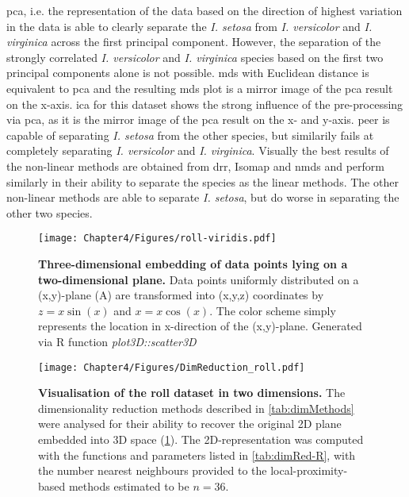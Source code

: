 \gls{pca}, i.e. the representation of the data based on the direction of highest variation in the data is able to clearly separate the \textit{I. setosa} from \textit{I. versicolor} and \textit{I. virginica} across the first principal component. However, the separation of the strongly correlated \textit{I. versicolor} and \textit{I. virginica} species based on the first two principal components alone is not possible. \gls{mds} with Euclidean distance is equivalent to \gls{pca} and the resulting \gls{mds} plot is a mirror image of the \gls{pca} result on the x-axis. \gls{ica} for this dataset shows the strong influence of the pre-processing via \gls{pca}, as it is the mirror image of the \gls{pca} result on the x- and y-axis. \gls{peer} is capable of separating \textit{I. setosa} from the other species, but similarily fails at completely separating \textit{I. versicolor} and \textit{I. virginica}. 
Visually the best results of the non-linear methods are obtained from \gls{drr}, Isomap and \gls{nmds} and perform similarly in their ability to separate the species as the linear methods. The other non-linear methods are able to separate \textit{I. setosa}, but do worse in separating the other two species.

\begin{figure}[p]
	\centering
	\texttt{[image: Chapter4/Figures/roll-viridis.pdf]}\\
	\caption[\textbf{Three-dimensional embedding of datapoints lying on a two-dimensional plane.}]{\textbf{Three-dimensional embedding of data points lying on a two-dimensional plane.} Data points uniformly distributed on a (x,y)-plane (A) are transformed into (x,y,z) coordinates by \(z = x \sin(x)\) and \(x = x \cos(x)\). The color scheme simply represents the location in x-direction of the (x,y)-plane.  Generated via R function \textit{plot3D::scatter3D}}
 	\label{fig:roll}
\end{figure}

\begin{figure}[hbtp]
	\centering
	\texttt{[image: Chapter4/Figures/DimReduction\_roll.pdf]}
	\caption[\textbf{Visualisation of the roll dataset in two dimensions.}]{\textbf{Visualisation of the roll dataset in two dimensions.} The dimensionality reduction methods described in \cref{tab:dimMethods} were analysed for their ability to recover the original 2D plane embedded into 3D space (\cref{fig:roll}). The 2D-representation was computed with the functions and parameters listed in \cref{tab:dimRed-R}, with the number nearest neighbours provided to the local-proximity-based methods estimated to be \(n=36\). } 
	 	\label{fig:dimRed-roll}
\end{figure}


